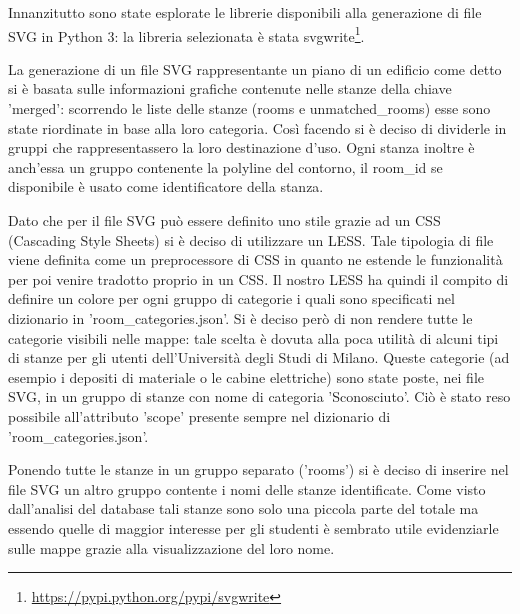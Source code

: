\documentclass[12pt]{report}
\begin{document}
\vspace{5mm} %

Innanzitutto sono state esplorate le librerie disponibili alla generazione di file SVG in Python 3: la libreria selezionata è stata svgwrite\footnote{\url{https://pypi.python.org/pypi/svgwrite}}.

La generazione di un file SVG rappresentante un piano di un edificio come detto si è basata sulle informazioni grafiche contenute nelle stanze della chiave 'merged': scorrendo le liste delle stanze (rooms e unmatched\_rooms)  esse sono state riordinate in base alla loro categoria.
Così facendo si è deciso di dividerle in gruppi che rappresentassero la loro destinazione d'uso.
Ogni stanza inoltre è anch'essa un gruppo contenente la polyline del contorno, il room\_id se disponibile è usato come identificatore della stanza.

Dato che per il file SVG può essere definito uno stile grazie ad un CSS (Cascading Style Sheets) si è deciso di utilizzare un LESS.
Tale tipologia di file viene definita come un preprocessore di CSS in quanto ne estende le funzionalità per poi venire tradotto proprio in un CSS.
Il nostro LESS ha quindi il compito di definire un colore per ogni gruppo di categorie i quali sono specificati nel dizionario in 'room\_categories.json'. 
Si è deciso però di non rendere tutte le categorie visibili nelle mappe: tale scelta è dovuta alla poca utilità di alcuni tipi di stanze per gli utenti dell'Università degli Studi di Milano.
Queste categorie (ad esempio i depositi di materiale o le cabine elettriche) sono state poste, nei file SVG, in un gruppo di stanze con nome di categoria 'Sconosciuto'. 
Ciò è stato reso possibile all'attributo 'scope' presente sempre nel dizionario di 'room\_categories.json'.

Ponendo tutte le stanze in un gruppo separato ('rooms') si è deciso di inserire nel file SVG un altro gruppo contente i nomi delle stanze identificate.
Come visto dall'analisi del database tali stanze sono solo una piccola parte del totale ma essendo quelle di maggior interesse per gli studenti è sembrato utile evidenziarle sulle mappe grazie alla visualizzazione del loro nome.
\end{document}
